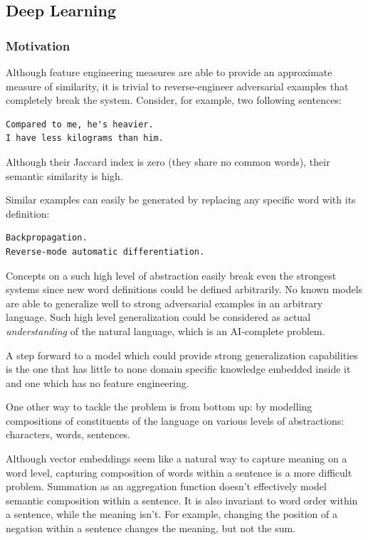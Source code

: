 \documentclass[10pt, a4paper]{article}
\begin{document}
\subsection{Deep Learning}

\subsubsection{Motivation}
Although feature engineering measures are able to provide an approximate measure of similarity, it is trivial to reverse-engineer adversarial examples that completely break the system.
Consider, for example, two following sentences:

\begin{lstlisting}
Compared to me, he's heavier.
I have less kilograms than him.
\end{lstlisting}

Although their Jaccard index is zero (they share no common words), their semantic similarity is high.

Similar examples can easily be generated by replacing any specific word with its definition:
\begin{lstlisting}
Backpropagation.
Reverse-mode automatic differentiation.
\end{lstlisting}

Concepts on a such high level of abstraction easily break even the strongest systems since new word definitions could be defined arbitrarily.
No known models are able to generalize well to strong adversarial examples in an arbitrary language. 
Such high level generalization could be considered as actual \textit{understanding} of the natural language, which is an AI-complete problem.

A step forward to a model which could provide strong generalization capabilities is the one that has little to none domain specific knowledge embedded inside it and one which has no feature engineering.

One other way to tackle the problem is from bottom up: by modelling compositions of constituents of the language on various levels of abstractions: characters, words, sentences.

Although vector embeddings seem like a natural way to capture meaning on a word level, capturing composition of words within a sentence is a more difficult problem.
Summation as an aggregation function doesn't effectively model semantic composition within a sentence.
It is also invariant to word order within a sentence, while the meaning isn't.
For example, changing the position of a negation within a sentence changes the meaning, but not the sum.
\end{document}
